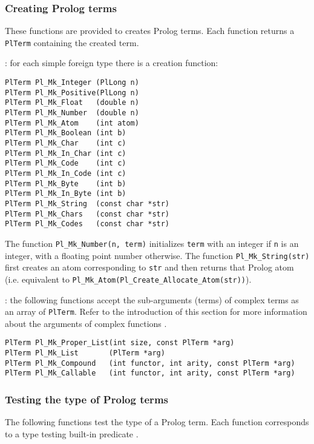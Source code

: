 \subsubsection{Creating Prolog terms}
\label{Creating-Prolog-terms}
These functions are provided to creates Prolog terms. Each function returns
a \texttt{PlTerm} containing the created term.

: for each simple foreign type
 there is a creation function:

\begin{Indentation}
\begin{verbatim}
PlTerm Pl_Mk_Integer (PlLong n)
PlTerm Pl_Mk_Positive(PlLong n)
PlTerm Pl_Mk_Float   (double n)
PlTerm Pl_Mk_Number  (double n)
PlTerm Pl_Mk_Atom    (int atom)
PlTerm Pl_Mk_Boolean (int b)
PlTerm Pl_Mk_Char    (int c)
PlTerm Pl_Mk_In_Char (int c)
PlTerm Pl_Mk_Code    (int c)
PlTerm Pl_Mk_In_Code (int c)
PlTerm Pl_Mk_Byte    (int b)
PlTerm Pl_Mk_In_Byte (int b)
PlTerm Pl_Mk_String  (const char *str)
PlTerm Pl_Mk_Chars   (const char *str)
PlTerm Pl_Mk_Codes   (const char *str)
\end{verbatim}
\end{Indentation}

The function \texttt{Pl\_Mk\_Number(n, term)} initializes \texttt{term} with an
integer if \texttt{n} is an integer, with a floating point number otherwise.
The function \texttt{Pl\_Mk\_String(str)} first creates an atom corresponding to
\texttt{str} and then returns that Prolog atom (i.e. equivalent to
\texttt{Pl\_Mk\_Atom(Pl\_Create\_Allocate\_Atom(str))}).

: the following functions accept the sub-arguments
(terms) of complex terms as an array of \texttt{PlTerm}. Refer to the
introduction of this section for more information about the arguments of
complex functions .

\begin{Indentation}
\begin{verbatim}
PlTerm Pl_Mk_Proper_List(int size, const PlTerm *arg)
PlTerm Pl_Mk_List       (PlTerm *arg)
PlTerm Pl_Mk_Compound   (int functor, int arity, const PlTerm *arg)
PlTerm Pl_Mk_Callable   (int functor, int arity, const PlTerm *arg)
\end{verbatim}
\end{Indentation}

\subsubsection{Testing the type of Prolog terms}
\label{Testing-the-type-of-Prolog-terms}
The following functions test the type of a Prolog term. Each function
corresponds to a type testing built-in predicate .

